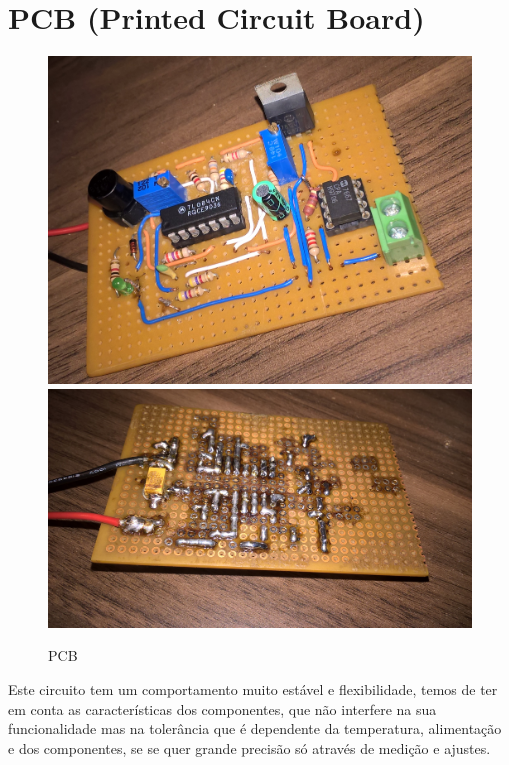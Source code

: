 \section{PCB (Printed Circuit Board)}
\begin{figure}[ht]
\begin{center}
	\includegraphics[scale=0.1]{./image/DevBoardPWM.jpg} \hspace{0.2cm}
	\includegraphics[scale=0.07]{./image/placa_2.jpg}
\end{center}
\caption{PCB}
\end{figure}\par
Este circuito tem um comportamento muito estável e flexibilidade, temos de ter em conta as características dos componentes, que não interfere na sua funcionalidade mas na tolerância que é dependente da temperatura, alimentação e dos componentes, se se quer grande precisão só através de medição e ajustes.
